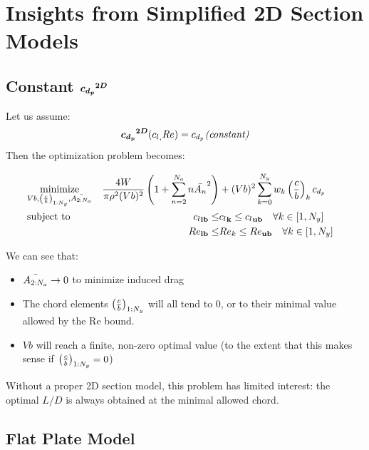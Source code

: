 \documentclass[letterpaper,12pt]{article}
\begin{document}
\section{Insights from Simplified 2D Section Models}
\subsection{Constant $\boldsymbol{{c_{d_p}}^{2D}}$}

Let us assume:
$$\boldsymbol{{c_{d_p}}^{2D}}({c_l}_{\bf ,} Re) = {c_{d_p}}_{\bf } \text{\it (constant)}$$
Then the optimization problem becomes:

\begin{align*}
	& \underset{Vb, \left( \frac c b \right)_{1:N_y}, \bar{A_{2:N_a}}}{\text{minimize}}  &
	\frac{4W}{\pi \rho^2 (Vb)^2} \left(1+\sum_{n=2}^{N_a} n \bar{A_{n}}^2\right) &+
(Vb)^2 \sum_{k=0}^{N_y} w_k \left( \frac c b \right)_{k} {c_{d_p}}_{\bf }  & \\
	& \text{subject to} & {c_l}_{\bf lb} \leq &{c_l}_{\bf k} \leq {c_l}_{\bf ub} \quad \forall k \in [1, N_y] \\
	& & {Re}_{\bf lb} \leq &{Re_k} \leq {Re}_{\bf ub} \quad \forall k \in [1, N_y] 
\end{align*}

We can see that:
\begin{itemize}
	\item $\bar{A_{2:N_a}} \rightarrow 0 $ to minimize induced drag
	\item The chord elements $\left( \frac c b \right)_{1:N_y}$ will all tend to 0, or to their minimal value allowed by the Re bound.
	\item $Vb$ will reach a finite, non-zero optimal value (to the extent that this makes sense if $\left( \frac c b \right)_{1:N_y} = 0$)
\end{itemize}
Without a proper 2D section model, this problem has limited interest: the optimal $L/D$ is always obtained at the minimal allowed chord.

\subsection{Flat Plate Model}
\end{document}
